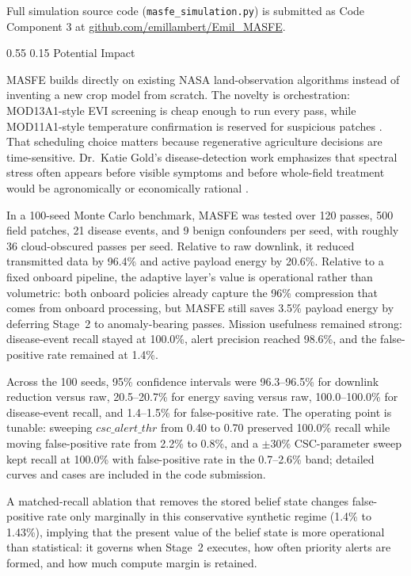 \documentclass[11pt,letterpaper]{article}
\makeatletter
\renewcommand\section{\@startsection{section}{1}{\z@}
  {0.55\baselineskip}
  {0.15\baselineskip}
  {\normalfont\large\bfseries}}
\makeatother
\begin{document}
Full simulation source code (\texttt{masfe\_simulation.py}) is submitted as Code Component 3 at \href{https://github.com/emillambert/Emil_MASFE}{github.com/emillambert/Emil\_MASFE}.

\section{Potential Impact}

MASFE builds directly on existing NASA land-observation algorithms instead of inventing a new crop model from scratch. The novelty is orchestration: MOD13A1-style EVI screening is cheap enough to run every pass, while MOD11A1-style temperature confirmation is reserved for suspicious patches \cite{mod13a1,mod11a1}. That scheduling choice matters because regenerative agriculture decisions are time-sensitive. Dr.\ Katie Gold's disease-detection work emphasizes that spectral stress often appears before visible symptoms and before whole-field treatment would be agronomically or economically rational \cite{gold-webinar1}.

In a 100-seed Monte Carlo benchmark, MASFE was tested over 120 passes, 500 field patches, 21 disease events, and 9 benign confounders per seed, with roughly 36 cloud-obscured passes per seed. Relative to raw downlink, it reduced transmitted data by 96.4\% and active payload energy by 20.6\%. Relative to a fixed onboard pipeline, the adaptive layer's value is operational rather than volumetric: both onboard policies already capture the 96\% compression that comes from onboard processing, but MASFE still saves 3.5\% payload energy by deferring Stage~2 to anomaly-bearing passes. Mission usefulness remained strong: disease-event recall stayed at 100.0\%, alert precision reached 98.6\%, and the false-positive rate remained at 1.4\%.

Across the 100 seeds, 95\% confidence intervals were 96.3--96.5\% for downlink reduction versus raw, 20.5--20.7\% for energy saving versus raw, 100.0--100.0\% for disease-event recall, and 1.4--1.5\% for false-positive rate. The operating point is tunable: sweeping $csc\_alert\_thr$ from 0.40 to 0.70 preserved 100.0\% recall while moving false-positive rate from 2.2\% to 0.8\%, and a $\pm30\%$ CSC-parameter sweep kept recall at 100.0\% with false-positive rate in the 0.7--2.6\% band; detailed curves and cases are included in the code submission.

A matched-recall ablation that removes the stored belief state changes false-positive rate only marginally in this conservative synthetic regime (1.4\% to 1.43\%), implying that the present value of the belief state is more operational than statistical: it governs when Stage~2 executes, how often priority alerts are formed, and how much compute margin is retained.
\end{document}

